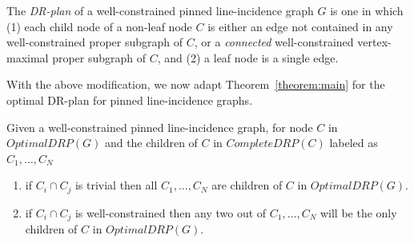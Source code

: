 
\begin{definition}

 The {\em DR-plan} of  a well-constrained pinned line-incidence graph $G$ is one in which 
(1) each child node of a non-leaf node $C$ is either an edge not contained in any well-constrained proper subgraph of $C$, or a {\em connected} well-constrained vertex-maximal proper subgraph of  $C$, and
(2) a leaf node is a single edge.
\end{definition}


With the above modification,
we now adapt Theorem~\ref{theorem:main} 
for the optimal DR-plan for  pinned line-incidence graphs.


\begin{corollary}
Given a well-constrained  pinned line-incidence graph, for node $C$ in $OptimalDRP(G)$ and the children of $C$ in $CompleteDRP(C)$ labeled as $C_1,\ldots,C_N$
\begin{enumerate}
    \item if $C_i \cap C_j$ is trivial then all $C_1,\ldots,C_N$ are children of $C$ in $OptimalDRP(G)$.
    \item if $C_i \cap C_j$ is well-constrained then any two out of $C_1,\ldots,C_N$ will be the only children of $C$ in $OptimalDRP(G)$.
\end{enumerate}
\label{cor:pinned}
\end{corollary}

